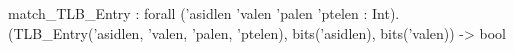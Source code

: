match_TLB_Entry : forall ('asidlen 'valen 'palen 'ptelen : Int).
  (TLB_Entry('asidlen, 'valen, 'palen, 'ptelen), bits('asidlen), bits('valen)) -> bool
